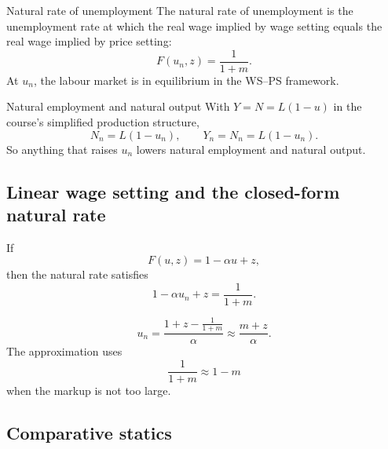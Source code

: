 \begin{center}
\end{center}

\begin{theorem}{Natural rate of unemployment}{}
The natural rate of unemployment is the unemployment rate at which the real wage implied by wage setting equals the real wage implied by price setting:
\[
F(u_n,z)=\frac{1}{1+m}.
\]
At $u_n$, the labour market is in equilibrium in the WS--PS framework.
\end{theorem}

\begin{theorem}{Natural employment and natural output}{}
With $Y=N=L(1-u)$ in the course's simplified production structure,
\[
N_n=L(1-u_n),
\qquad
Y_n=N_n=L(1-u_n).
\]
So anything that raises $u_n$ lowers natural employment and natural output.
\end{theorem}

\subsection{Linear wage setting and the closed-form natural rate}

If
\[
F(u,z)=1-\alpha u+z,
\]
then the natural rate satisfies
\[
1-\alpha u_n+z=\frac{1}{1+m}.
\]

\begin{keyformula}[title={Key Formula: Closed-form natural rate}]
\[
u_n=\frac{1+z-\frac{1}{1+m}}{\alpha}
\approx \frac{m+z}{\alpha}.
\]
The approximation uses
\[
\frac{1}{1+m}\approx 1-m
\]
when the markup is not too large.
\end{keyformula}

\subsection{Comparative statics}


